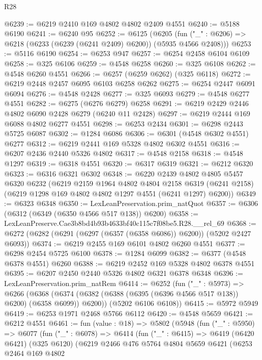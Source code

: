 \begin{lexlean}{R28}
\begin{coremodule}
@6239 := @6219 @2410 @169 @4802 @4802 @2409 @4551
@6240 := @5188 @6190
@6241 := @6240 @95
@6252 := @6125
    (@6205 (fun ("_" : @6206) => @6218 (@6233 (@6239 (@6241 @2409) @6200)) (@5935 @4566 @2408)))
@6253 := @5116 @6190
@6254 := @6253 @947
@6257 := @6254 @2458 @6104 @6109
@6258 := @325 @6106
@6259 := @4548 @6258
@6260 := @325 @6108
@6262 := @4548 @6260 @4551
@6266 := @6257 (@6259 @6262) (@325 @6118)
@6272 := @6219 @2448 @2457 @6095 @6103 @6258 @6262
@6275 := @6254 @2447 @6091 @6094
@6276 := @4548 @2428
@6277 := @325 @6093
@6279 := @4548 @6277 @4551
@6282 := @6275 (@6276 @6279) @6258
@6291 := @6219 @2429 @2446 @4802 @6090 @2428 @6279 (@6240 @11 @2428)
@6297 := @6219 @2444 @169 @6088 @4802 @6277 @4551
@6298 := @6253 @2434
@6301 := @6298 @2443 @5725 @6087
@6302 := @1284 @6086
@6306 := @6301 (@4548 @6302 @4551) @6277
@6312 := @6219 @2441 @169 @5328 @4802 @6302 @4551
@6316 := @6207 @2436 @2440 @5326 @4802
@6317 := @4548 @2158
@6318 := @4548 @1297
@6319 := @6318 @4551
@6320 := @6317 @6319
@6321 := @6212 @6320
@6323 := @6316 @6321 @6302
@6348 := @6220
    @2439
    @4802
    @4805
    @5457
    @6320
    @6232
    (@6219
      @2159
      @1964
      @4802
      @4804
      @2158
      @6319
      (@6241 @2158)
      (@6219 @1298 @169 @4802 @4802 @1297 @4551 (@6241 @1297) @6200))
@6349 := @6323 @6348
@6350 := LexLeanPreservation.prim_natQuot
@6357 := @6306 (@6312 (@6349 (@6350 @4566 @517 @138)) @6200)
@6358 := LexLeanPreserve.Cae3b8bd4b93b4633bf40c115c7f08be5.R28.__rel_69
@6368 := @6272 (@6282 (@6291 (@6297 (@6357 (@6358 @6086)) @6200)) (@5202 @2427 @6093))
@6374 := @6219 @2455 @169 @6101 @4802 @6260 @4551
@6377 := @6298 @2454 @5725 @6100
@6378 := @1284 @6099
@6382 := @6377 (@4548 @6378 @4551) @6260
@6388 := @6219 @2452 @169 @5328 @4802 @6378 @4551
@6395 := @6207 @2450 @2440 @5326 @4802 @6321 @6378 @6348
@6396 := LexLeanPreservation.prim_natRem
@6414 := @6252
    (fun ("_" : @5973) =>
    @6266
      (@6368 (@6374 (@6382 (@6388 (@6395 (@6396 @4566 @517 @138)) @6200) (@6358 @6099)) @6200))
      (@5202 @6106 @6108))
@6415 := @5972 @5949
@6419 := @6253 @1971 @2468 @5766 @6112
@6420 := @4548 @5659
@6421 := @6212 @4551
@6461 := fun (value : @18) =>
  @5802
    (@5948
      (fun ("_" : @5950) =>
      @6077
        (fun ("_" : @6078) =>
        @6414
          (fun ("_" : @6415) =>
          @6419
            (@6420 @6421)
            (@325 @6120)
            (@6219
              @2466
              @476
              @5764
              @4804
              @5659
              @6421
              (@6253
                @2464
                @169
                @4802

\end{coremodule}
\end{lexlean}
